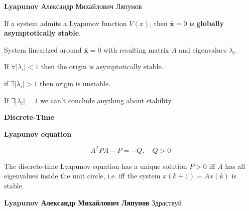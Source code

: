\begin{sstTitleBox}[Plum]{\center\textbf{{\large
					Lyapunov
				}	}
		Александр Михайлович Ляпунов
	}
	\begin{sstOnlyFrame}[Plum]
		\begin{theorem}
			If a system admits a Lyapunov function $V(x)$,
			then $\bar{\mathbf{x}} = 0$ is
			\textbf{globally asymptotically stable}.
		\end{theorem}
	\end{sstOnlyFrame}


	\begin{sstOnlyFrame}[Plum]
		\begin{theorem}
			System linearized around $\bar{\mathbf{x}}=0$
			with resulting matrix $A$ and eigenvalues $\lambda_i$.

			If	$\forall |\lambda_i| < 1$
			then the origin is asymptotically stable.

			if $\exists |\lambda_i| > 1$
			then origin is unstable.

			If $\exists |\lambda_i| = 1$
			we can't conclude anything about stability.
		\end{theorem}
	\end{sstOnlyFrame}

	\begin{sstOnlyFrame}[Plum]
		\begin{minipage}[c]{0.34\linewidth}
			\textbf{Discrete-Time}

			\textbf{Lyapunov equation}
		\end{minipage}
		\begin{minipage}[b]{0.64\linewidth}
			\[A^TPA-P=-Q,\quad Q>0\]
		\end{minipage}
	\end{sstOnlyFrame}

	\begin{sstOnlyFrame}[Plum]
		\begin{theorem}
			The discrete-time Lyapunov equation has a unique solution
			$P > 0$ iff $A$ has all eigenvalues inside the unit circle,
			i.e. iff the system $x(k+1) = Ax(k)$ is stable.
		\end{theorem}
	\end{sstOnlyFrame}
\end{sstTitleBox}

\begin{sstTitleBox}[Plum]{\center\textbf{{\large
					Lyapunov
				}
			Александр Михайлович Ляпунов
		}}
	Здраствуй
\end{sstTitleBox}
